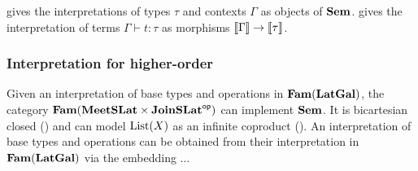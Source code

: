  gives the interpretations of types $\tau$ and contexts $\Gamma$ as objects of $\mathbf{Sem}$.
 gives the interpretation of terms $\Gamma \vdash t: \tau$ as morphisms $\llbracket \Gamma \rrbracket
\to \llbracket \tau \rrbracket$.

\subsubsection{Interpretation for higher-order \GPS}

Given an interpretation of base types and operations in $\mathbf{Fam}(\mathbf{LatGal})$, the category $\mathbf{Fam}(\mathbf{MeetSLat} \times
\mathbf{JoinSLat}^{\mathsf{op}})$ can implement $\mathbf{Sem}$. It is bicartesian closed () and can model
$\mathrm{List}(X)$ as an infinite coproduct (). An interpretation
of base types and operations can be obtained from their interpretation in $\mathbf{Fam}(\mathbf{LatGal})$ via the embedding
...
